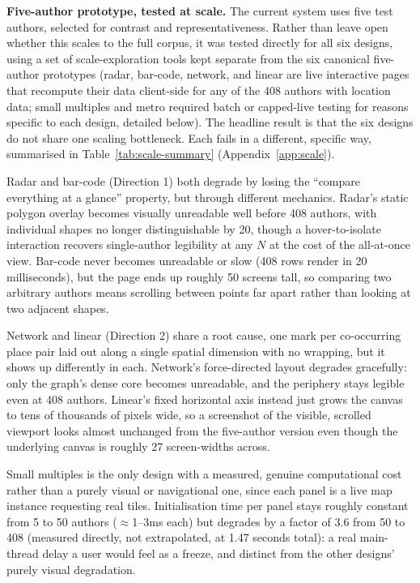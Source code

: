 \documentclass[logo,msc]{infthesis}
\begin{document}
\textbf{Five-author prototype, tested at scale.} The current system uses five test authors, selected for contrast and representativeness. Rather than leave open whether this scales to the full corpus, it was tested directly for all six designs, using a set of scale-exploration tools kept separate from the six canonical five-author prototypes (radar, bar-code, network, and linear are live interactive pages that recompute their data client-side for any of the 408 authors with location data; small multiples and metro required batch or capped-live testing for reasons specific to each design, detailed below). The headline result is that the six designs do not share one scaling bottleneck. Each fails in a different, specific way, summarised in Table~\ref{tab:scale-summary} (Appendix~\ref{app:scale}).

Radar and bar-code (Direction 1) both degrade by losing the ``compare everything at a glance'' property, but through different mechanics. Radar's static polygon overlay becomes visually unreadable well before 408 authors, with individual shapes no longer distinguishable by 20, though a hover-to-isolate interaction recovers single-author legibility at any $N$ at the cost of the all-at-once view. Bar-code never becomes unreadable or slow (408 rows render in 20 milliseconds), but the page ends up roughly 50 screens tall, so comparing two arbitrary authors means scrolling between points far apart rather than looking at two adjacent shapes.

Network and linear (Direction 2) share a root cause, one mark per co-occurring place pair laid out along a single spatial dimension with no wrapping, but it shows up differently in each. Network's force-directed layout degrades gracefully: only the graph's dense core becomes unreadable, and the periphery stays legible even at 408 authors. Linear's fixed horizontal axis instead just grows the canvas to tens of thousands of pixels wide, so a screenshot of the visible, scrolled viewport looks almost unchanged from the five-author version even though the underlying canvas is roughly 27 screen-widths across.

Small multiples is the only design with a measured, genuine computational cost rather than a purely visual or navigational one, since each panel is a live map instance requesting real tiles. Initialisation time per panel stays roughly constant from 5 to 50 authors ($\approx$1--3ms each) but degrades by a factor of 3.6 from 50 to 408 (measured directly, not extrapolated, at 1.47 seconds total): a real main-thread delay a user would feel as a freeze, and distinct from the other designs' purely visual degradation.
\end{document}
